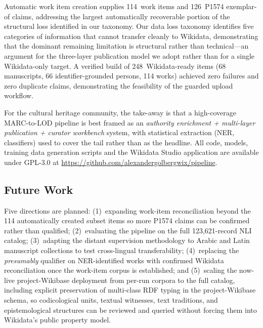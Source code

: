 \documentclass[Afour,sageh,times]{sagej}
\begin{document}
Automatic work item creation supplies 114~work items and 126~P1574 exemplar-of claims, addressing the largest automatically recoverable portion of the structural loss identified in our taxonomy. Our data loss taxonomy identifies five categories of information that cannot transfer cleanly to Wikidata, demonstrating that the dominant remaining limitation is structural rather than technical---an argument for the three-layer publication model we adopt rather than for a single Wikidata-only target. A verified build of 248~Wikidata-ready items (68 manuscripts, 66 identifier-grounded persons, 114 works) achieved zero failures and zero duplicate claims, demonstrating the feasibility of the guarded upload workflow.

For the cultural heritage community, the take-away is that a high-coverage MARC-to-LOD pipeline is best framed as an \emph{authority enrichment + multi-layer publication + curator workbench} system, with statistical extraction (NER, classifiers) used to cover the tail rather than as the headline. All code, models, training data generation scripts and the Wikidata Studio application are available under GPL-3.0 at \url{https://github.com/alexandergolbergwix/pipeline}.

\subsection{Future Work}

Five directions are planned: (1)~expanding work-item reconciliation beyond the 114 automatically created subset items so more P1574 claims can be confirmed rather than qualified; (2)~evaluating the pipeline on the full 123,621-record NLI catalog; (3)~adapting the distant supervision methodology to Arabic and Latin manuscript collections to test cross-lingual transferability; (4)~replacing the \emph{presumably} qualifier on NER-identified works with confirmed Wikidata reconciliation once the work-item corpus is established; and (5)~scaling the now-live project-Wikibase deployment from per-run corpora to the full catalog, including explicit preservation of multi-class RDF typing in the project-Wikibase schema, so codicological units, textual witnesses, text traditions, and epistemological structures can be reviewed and queried without forcing them into Wikidata's public property model.


\end{document}
